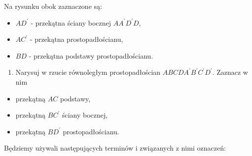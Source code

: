 \documentclass[10pt]{article}
\begin{document}
Na rysunku obok zaznaczone są:

\begin{itemize}
  \item \(A D^{\prime}\) - przekątna ściany bocznej \(A A^{\prime} D^{\prime} D\),
  \item \(A C^{\prime}\) - przekątna prostopadłościanu,
  \item \(B D\) - przekątna podstawy prostopadłościanu.
\end{itemize}

\begin{enumerate}
  \item Narysuj w rzucie równoległym prostopadłościan \(A B C D A^{\prime} B^{\prime} C^{\prime} D^{\prime}\). Zaznacz w nim
\end{enumerate}

\begin{itemize}
  \item przekątną \(A C\) podstawy,
  \item przekątną \(B C^{\prime}\) ściany bocznej,
  \item przekątną \(B D^{\prime}\) prostopadłościanu.
\end{itemize}

Będziemy używali następujących terminów i związanych z nimi oznaczeń:
\end{document}
